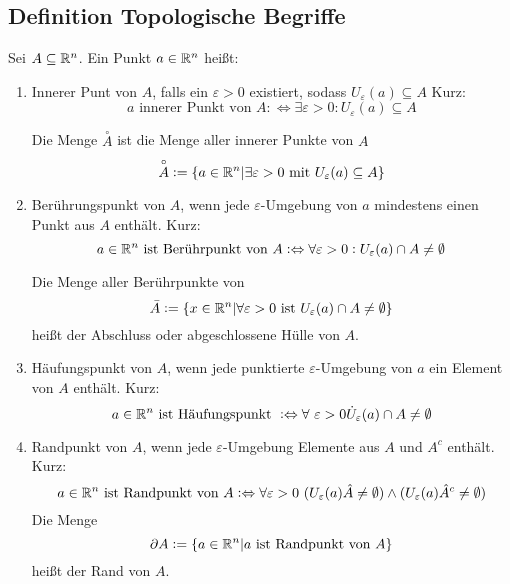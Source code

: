 \subsection{Definition Topologische Begriffe}
Sei $A \subseteq \mathbb{R}^n$. Ein Punkt $a \in \mathbb{R}^n$ heißt:
\begin{enumerate}[label= (\alph*)]
    \item Innerer Punt von $A$, falls ein $\varepsilon > 0$ existiert, sodass
        $U_\varepsilon(a) \subseteq A$
        Kurz:
        \begin{equation*}
            a \text{ innerer Punkt von }A :\Leftrightarrow \exists \varepsilon>0
            : U_\varepsilon(a) \subseteq A
        \end{equation*}

        Die Menge $\overset{\circ}{A}$ ist die Menge aller innerer Punkte von $A$
        \begin{equation*}
            \overset{\circ}{A} := \{ a \in \mathbb{R}^n | \exists \varepsilon > 0 \text{ mit }
            U_\varepsilon(a) \subseteq A \}
        \end{equation*}
    \item Berührungspunkt von $A$, wenn jede $\varepsilon$-Umgebung von $a$ mindestens
        einen Punkt aus $A$ enthält.
        Kurz:
        \begin{equation*}
            a \in \mathbb{R}^n \text{ ist Berührpunkt von } A :\Leftrightarrow
            \forall \varepsilon>0: U_\varepsilon(a) \cap A \neq \emptyset
        \end{equation*}

        Die Menge aller Berührpunkte von
        \begin{equation*}
            \bar{A} := \{ x \in \mathbb{R}^n | \forall \varepsilon > 0 \text{ ist }
            U_\varepsilon(a) \cap A \neq \emptyset \}
        \end{equation*}
        heißt der Abschluss oder abgeschlossene Hülle von $A$.
    \item Häufungspunkt von $A$, wenn jede punktierte $\varepsilon$-Umgebung von
        $a$ ein Element von $A$ enthält.
        Kurz:
        \begin{equation*}
            a \in \mathbb{R}^n \text{ ist Häufungspunkt } :\Leftrightarrow
            \forall\ \varepsilon > 0 \dot{U}_\varepsilon(a) \cap A \neq \emptyset
        \end{equation*}
    \item Randpunkt von $A$, wenn jede $\varepsilon$-Umgebung Elemente aus $A$
        und $A^c$ enthält.
        Kurz:
        \begin{equation*}
            a \in \mathbb{R}^n \text{ ist Randpunkt von }A :\Leftrightarrow
            \forall \varepsilon > 0\
            (U_\varepsilon(a) \hat A \neq \emptyset) \land
            (U_\varepsilon(a) \hat A^c \neq \emptyset)
        \end{equation*}
        Die Menge
        \begin{equation*}
            \partial A := \{ a \in \mathbb{R}^n | a \text{ ist Randpunkt von }A \}
        \end{equation*}
        heißt der Rand von $A$.
\end{enumerate}

